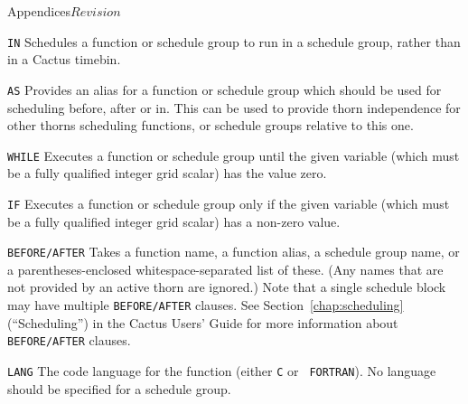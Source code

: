 \begin{cactuspart}{Appendices}{}{$Revision$}
\begin{Lentry}
  \item[{\tt IN}] Schedules a function or schedule group to run in a
  schedule group, rather than in a Cactus timebin.

  \item[{\tt AS}] Provides an alias for a function or schedule group
  which should be used for scheduling before, after or in.  This can
  be used to provide thorn independence for other thorns scheduling
  functions, or schedule groups relative to this one.

  \item[{\tt WHILE}] Executes a function or schedule group until the given
    variable (which must be a fully qualified integer grid scalar) has
    the value zero.

  \item[{\tt IF}] Executes a function or schedule group only if the given
    variable (which must be a fully qualified integer grid scalar) has
    a non-zero value.

  \item[{\tt BEFORE/AFTER}] Takes a function name, a function alias,
  a schedule group name, or a parentheses-enclosed whitespace-separated
  list of these.  (Any names that are not provided by an active thorn
  are ignored.)  Note that a single schedule block may have multiple
  {\tt BEFORE/AFTER} clauses.
  See Section~\ref{chap:scheduling}
  (``Scheduling'') in the Cactus Users' Guide for more information
  about {\tt BEFORE/AFTER} clauses.

  \item[{\tt LANG}] The code language for the function (either {\tt C} or {\tt
    FORTRAN}). No language should be specified for a schedule group.


\end{Lentry}
\end{cactuspart}

